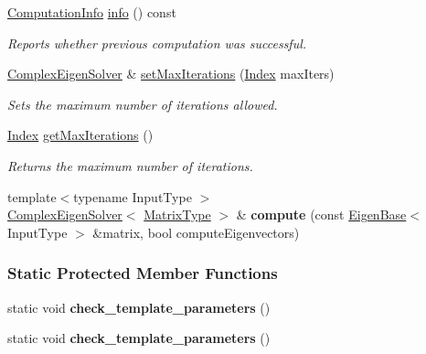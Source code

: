 \begin{DoxyCompactItemize}
\hyperlink{group__enums_ga85fad7b87587764e5cf6b513a9e0ee5e}{Computation\+Info} \hyperlink{group___eigenvalues___module_ad4d9d8b90145900b9686d2dabbe46730}{info} () const
\begin{DoxyCompactList}\small\item\em Reports whether previous computation was successful. \end{DoxyCompactList}\item 
\mbox{\label{group___eigenvalues___module_a0c5a974da17774d75be41e351e6bda62}} 
\hyperlink{group___eigenvalues___module_class_eigen_1_1_complex_eigen_solver}{Complex\+Eigen\+Solver} \& \hyperlink{group___eigenvalues___module_a0c5a974da17774d75be41e351e6bda62}{set\+Max\+Iterations} (\hyperlink{group___eigenvalues___module_abc0218d8b902af0d6c759bfc0a8a8d74}{Index} max\+Iters)
\begin{DoxyCompactList}\small\item\em Sets the maximum number of iterations allowed. \end{DoxyCompactList}\item 
\mbox{\label{group___eigenvalues___module_aeec4754e32bf2d1c650bf3aed110c3d3}} 
\hyperlink{group___eigenvalues___module_abc0218d8b902af0d6c759bfc0a8a8d74}{Index} \hyperlink{group___eigenvalues___module_aeec4754e32bf2d1c650bf3aed110c3d3}{get\+Max\+Iterations} ()
\begin{DoxyCompactList}\small\item\em Returns the maximum number of iterations. \end{DoxyCompactList}\item 
\mbox{\label{group___eigenvalues___module_ab9d4912f1fd8415c13ca5b26a6298e03}} 
{\footnotesize template$<$typename Input\+Type $>$ }\\\hyperlink{group___eigenvalues___module_class_eigen_1_1_complex_eigen_solver}{Complex\+Eigen\+Solver}$<$ \hyperlink{group___eigenvalues___module_ad61f6278843a601096276c9a72c0252f}{Matrix\+Type} $>$ \& {\bfseries compute} (const \hyperlink{group___core___module_struct_eigen_1_1_eigen_base}{Eigen\+Base}$<$ Input\+Type $>$ \&matrix, bool compute\+Eigenvectors)
\end{DoxyCompactItemize}
\subsubsection*{Static Protected Member Functions}
\begin{DoxyCompactItemize}
\item 
\mbox{\label{group___eigenvalues___module_ad20cfdbbbeb1013d37dc1d82e20405ec}} 
static void {\bfseries check\+\_\+template\+\_\+parameters} ()
\item 
\mbox{\label{group___eigenvalues___module_ad20cfdbbbeb1013d37dc1d82e20405ec}} 
static void {\bfseries check\+\_\+template\+\_\+parameters} ()
\end{DoxyCompactItemize}
